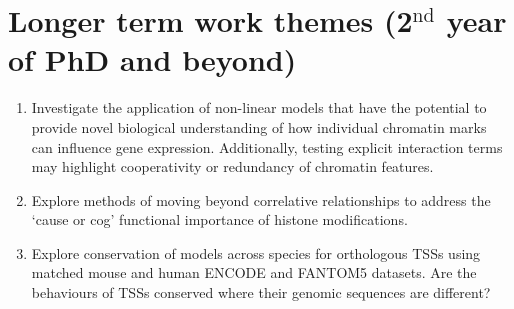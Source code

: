 \documentclass[a4paper]{report}
\begin{document}
\section*{Longer term work themes (2$^{\text{nd}}$ year of PhD and beyond)}
\begin{enumerate}
\item Investigate the application of non-linear models that have the
  potential to provide novel biological understanding of how
  individual chromatin marks can influence gene
  expression. Additionally, testing explicit interaction terms may
  highlight cooperativity or redundancy of chromatin features.
\item Explore methods of moving beyond correlative relationships to
  address the `cause or cog' functional importance of histone
  modifications.
\item Explore conservation of models across species for orthologous TSSs using matched mouse and human ENCODE and FANTOM5 datasets. Are the behaviours of TSSs conserved where their genomic sequences are different?
\end{enumerate}

%

\begin{small}

\end{small}
\end{document}
